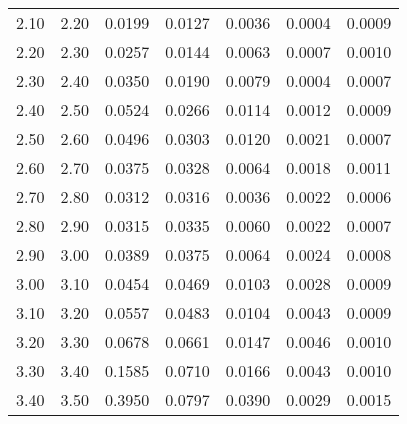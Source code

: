 \begin{tabular}{|c|c||c|c|c|c|c|}
    2.10 &    2.20 & 0.0199 & 0.0127 & 0.0036 & 0.0004 & 0.0009 \\ 
    2.20 &    2.30 & 0.0257 & 0.0144 & 0.0063 & 0.0007 & 0.0010 \\ 
    2.30 &    2.40 & 0.0350 & 0.0190 & 0.0079 & 0.0004 & 0.0007 \\ 
    2.40 &    2.50 & 0.0524 & 0.0266 & 0.0114 & 0.0012 & 0.0009 \\ 
    2.50 &    2.60 & 0.0496 & 0.0303 & 0.0120 & 0.0021 & 0.0007 \\ 
    2.60 &    2.70 & 0.0375 & 0.0328 & 0.0064 & 0.0018 & 0.0011 \\ 
    2.70 &    2.80 & 0.0312 & 0.0316 & 0.0036 & 0.0022 & 0.0006 \\ 
    2.80 &    2.90 & 0.0315 & 0.0335 & 0.0060 & 0.0022 & 0.0007 \\ 
    2.90 &    3.00 & 0.0389 & 0.0375 & 0.0064 & 0.0024 & 0.0008 \\ 
    3.00 &    3.10 & 0.0454 & 0.0469 & 0.0103 & 0.0028 & 0.0009 \\ 
    3.10 &    3.20 & 0.0557 & 0.0483 & 0.0104 & 0.0043 & 0.0009 \\ 
    3.20 &    3.30 & 0.0678 & 0.0661 & 0.0147 & 0.0046 & 0.0010 \\ 
    3.30 &    3.40 & 0.1585 & 0.0710 & 0.0166 & 0.0043 & 0.0010 \\ 
    3.40 &    3.50 & 0.3950 & 0.0797 & 0.0390 & 0.0029 & 0.0015 \\ 
\hline
\end{tabular}
